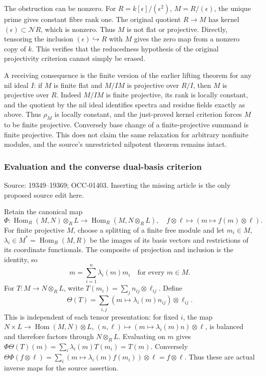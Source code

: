 The obstruction can be nonzero. For \(R=k[\epsilon]/(\epsilon^2)\), \(M=R/(\epsilon)\), the unique prime gives constant fibre rank one. The original quotient \(R\to M\) has kernel \((\epsilon)\subset\mathcal NR\), which is nonzero. Thus \(M\) is not flat or projective. Directly, tensoring the inclusion \((\epsilon)\hookrightarrow R\) with \(M\) gives the zero map from a nonzero copy of \(k\). This verifies that the reducedness hypothesis of the original projectivity criterion cannot simply be erased.

A receiving consequence is the finite version of the earlier lifting theorem for any nil ideal \(I\): if \(M\) is finite flat and \(M/IM\) is projective over \(R/I\), then \(M\) is projective over \(R\). Indeed \(M/IM\) is finite projective, its rank is locally constant, and the quotient by the nil ideal identifies spectra and residue fields exactly as above. Thus \(\rho_M\) is locally constant, and the just-proved kernel criterion forces \(M\) to be finite projective. Conversely base change of a finite-projective summand is finite projective. This does not claim the same relaxation for arbitrary nonfinite modules, and the source's unrestricted nilpotent theorem remains intact.

\subsubsection{Evaluation and the converse dual-basis criterion}\label{evaluation-and-the-converse-dual-basis-criterion}

Source: 19349--19369; OCC-01403. Inserting the missing article is the only proposed source edit here.

Retain the canonical map \[
\Phi:\operatorname{Hom}_R(M,N)\otimes_RL\longrightarrow
\operatorname{Hom}_R(M,N\otimes_RL),
\quad f\otimes\ell\longmapsto(m\mapsto f(m)\otimes\ell).
\] For finite projective \(M\), choose a splitting of a finite free module and let \(m_i\in M\), \(\lambda_i\in M^*=\operatorname{Hom}_R(M,R)\) be the images of its basis vectors and restrictions of its coordinate functionals. The composite of projection and inclusion is the identity, so \[
m=\sum_{i=1}^n\lambda_i(m)m_i\quad\text{for every }m\in M.
\] For \(T:M\to N\otimes_RL\), write \(T(m_i)=\sum_j n_{ij}\otimes\ell_{ij}\). Define \[
\Theta(T)=\sum_{i,j}(m\mapsto\lambda_i(m)n_{ij})\otimes\ell_{ij}.
\] This is independent of each tensor presentation: for fixed \(i\), the map \(N\times L\to\operatorname{Hom}(M,N)\otimes L\), \((n,\ell)\mapsto(m\mapsto\lambda_i(m)n)\otimes\ell\), is balanced and therefore factors through \(N\otimes_RL\). Evaluating on \(m\) gives \(\Phi\Theta(T)(m)=\sum_i\lambda_i(m)T(m_i)=T(m)\). Conversely \(\Theta\Phi(f\otimes\ell)=\sum_i(m\mapsto\lambda_i(m)f(m_i))\otimes\ell=f\otimes\ell\). Thus these are actual inverse maps for the source assertion.

